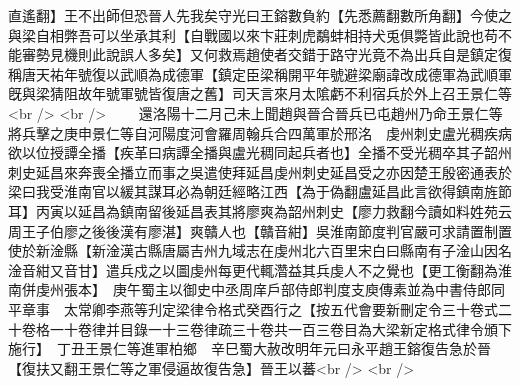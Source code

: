 直遙翻】王不出師但恐晉人先我矣守光曰王鎔數負約【先悉薦翻數所角翻】今使之與梁自相弊吾可以坐承其利【自戰國以來卞莊刺虎鷸蚌相持犬兎俱斃皆此說也苟不能審勢見機則此說誤人多矣】又何救焉趙使者交錯于路守光竟不為出兵自是鎮定復稱唐天祐年號復以武順為成德軍【鎮定臣梁稱開平年號避梁廟諱改成德軍為武順軍旣與梁猜阻故年號軍號皆復唐之舊】司天言來月太隂虧不利宿兵於外上召王景仁等<br />
<br />
　　還洛陽十二月己未上聞趙與晉合晉兵已屯趙州乃命王景仁等將兵擊之庚申景仁等自河陽度河會羅周翰兵合四萬軍於邢洺　虔州刺史盧光稠疾病欲以位授譚全播【疾革曰病譚全播與盧光稠同起兵者也】全播不受光稠卒其子韶州刺史延昌來奔喪全播立而事之吳遣使拜延昌虔州刺史延昌受之亦因楚王殷密通表於梁曰我受淮南官以緩其謀耳必為朝廷經略江西【為于偽翻盧延昌此言欲得鎮南旌節耳】丙寅以延昌為鎮南留後延昌表其將廖爽為韶州刺史【廖力救翻今讀如料姓苑云周王子伯廖之後後漢有廖湛】爽贛人也【贛音紺】吳淮南節度判官嚴可求請置制置使於新淦縣【新淦漢古縣唐屬吉州九域志在虔州北六百里宋白曰縣南有子淦山因名淦音紺又音甘】遣兵戍之以圖虔州每更代輒濳益其兵虔人不之覺也【更工衡翻為淮南併虔州張本】　庚午蜀主以御史中丞周庠戶部侍郎判度支庾傳素並為中書侍郎同平章事　太常卿李燕等刋定梁律令格式癸酉行之【按五代會要新刪定令三十卷式二十卷格一十卷律并目錄一十三卷律疏三十卷共一百三卷目為大梁新定格式律令頒下施行】　丁丑王景仁等進軍柏鄉　辛巳蜀大赦改明年元曰永平趙王鎔復告急於晉【復扶又翻王景仁等之軍侵逼故復告急】晉王以蕃<br />
<br />
